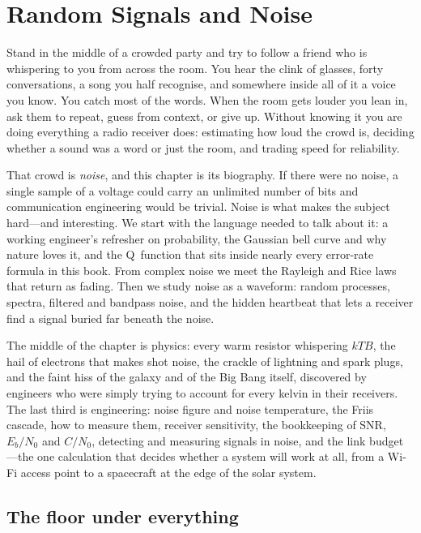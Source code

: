 \chapter{Random Signals and Noise}
\label{ch:noise}

\begin{chapterintro}
Stand in the middle of a crowded party and try to follow a friend who is whispering to you from
across the room. You hear the clink of glasses, forty conversations, a song you half recognise,
and somewhere inside all of it a voice you know. You catch most of the words. When the room gets
louder you lean in, ask them to repeat, guess from context, or give up. Without knowing it you are
doing everything a radio receiver does: estimating how loud the crowd is, deciding whether a sound
was a word or just the room, and trading speed for reliability.

That crowd is \emph{noise}, and this chapter is its biography. If there were no noise, a single
sample of a voltage could carry an unlimited number of bits and communication engineering would
be trivial. Noise is what makes the subject hard---and interesting. We start with the language
needed to talk about it: a working engineer's refresher on probability, the Gaussian bell curve
and why nature loves it, and the Q~function that sits inside nearly every error-rate formula in
this book. From complex noise we meet the Rayleigh and Rice laws that return as fading. Then we
study noise as a waveform: random processes, spectra, filtered and bandpass noise, and the
hidden heartbeat that lets a receiver find a signal buried far beneath the noise.

The middle of the chapter is physics: every warm resistor whispering $kTB$, the hail of
electrons that makes shot noise, the crackle of lightning and spark plugs, and the faint hiss of
the galaxy and of the Big Bang itself, discovered by engineers who were simply trying to account
for every kelvin in their receivers. The last third is engineering: noise figure and noise
temperature, the Friis cascade, how to measure them, receiver sensitivity, the bookkeeping of
SNR, $E_b/N_0$ and $C/N_0$, detecting and measuring signals in noise, and the link budget---the
one calculation that decides whether a system will work at all, from a Wi-Fi access point to a
spacecraft at the edge of the solar system.
\end{chapterintro}

\section{The floor under everything}
\label{sec:ch03:floor}

